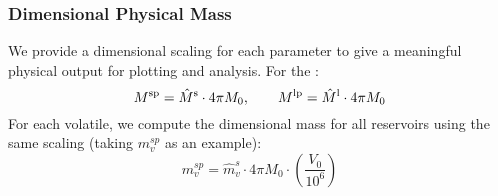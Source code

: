 \subsubsection{Dimensional Physical Mass}
We provide a dimensional scaling for each parameter to give a meaningful physical output for plotting and analysis.  For the :
\begin{equation}
M^{\rm sp} = \hat{M}^{\rm s} \cdot 4 \pi M_0, \qquad M^{\rm lp} = \hat{M}^{\rm l} \cdot 4 \pi M_0
\end{equation}
For each volatile, we compute the dimensional mass for all reservoirs using the same scaling (taking $m_v^{sp}$ as an example):
\begin{equation}
m_v^{sp} = \hat{m}_v^s \cdot 4 \pi M_0 \cdot \left( \frac{V_0}{10^6} \right)
\end{equation}
